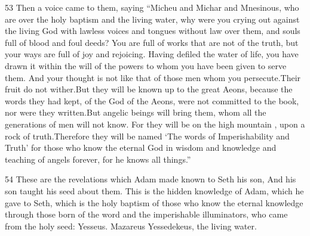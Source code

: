 \par 53 Then a voice came to them, saying “Micheu and Michar and Mnesinous, who are over the holy baptism and the living water, why were you crying out against the living God with lawless voices and tongues without law over them, and souls full of blood and foul deeds? You are full of works that are not of the truth, but your ways are full of joy and rejoicing. Having defiled the water of life, you have drawn it within the will of the powers to whom you have been given to serve them. And your thought is not like that of those men whom you persecute.Their fruit do not wither.But they will be known up to the great Aeons, because the words they had kept, of the God of the Aeons, were not committed to the book, nor were they written.But angelic beings will bring them, whom all the generations of men will not know. For they will be on the high mountain , upon a rock of truth.Therefore they will be named ‘The words of Imperishability and Truth’ for those who know the eternal God in wisdom and knowledge and teaching of angels forever, for he knows all things.”

\par 54 These are the revelations which Adam made known to Seth his son, And his son taught his seed about them. This is the hidden knowledge of Adam, which he gave to Seth, which is the holy baptism of those who know the eternal knowledge through those born of the word and the imperishable illuminators, who came from the holy seed: Yesseus. Mazareus Yessedekeus, the living water.


